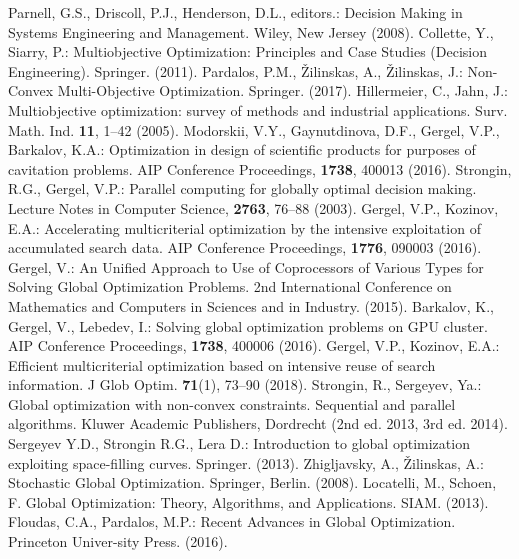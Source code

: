 \documentclass[runningheads]{llncs}
\begin{document}
%
%
%
% 
% 
%
\begin{thebibliography}{8}

	Parnell, G.S., Driscoll, P.J., Henderson, D.L., editors.: Decision Making in Systems Engineering and Management. Wiley, New Jersey (2008).
	Collette, Y., Siarry, P.: Multiobjective Optimization: Principles and Case Studies (Decision Engineering). Springer. (2011).
	Pardalos, P.M., {\v Z}ilinskas, A., {\v Z}ilinskas, J.: Non-Convex Multi-Objective Optimization. Springer. (2017).
	Hillermeier, C., Jahn, J.: Multiobjective optimization: survey of methods and industrial applications. Surv. Math. Ind. \textbf{11}, 1--42 (2005).
	Modorskii, V.Y., Gaynutdinova, D.F., Gergel, V.P., Barkalov, K.A.: Optimization in design of scientific products for purposes of cavitation problems. AIP Conference Proceedings, \textbf{1738}, 400013 (2016). 
	Strongin, R.G., Gergel, V.P.: Parallel computing for globally optimal decision making. Lecture Notes in Computer Science, \textbf{2763}, 76--88 (2003).
	Gergel, V.P., Kozinov, E.A.: Accelerating multicriterial optimization by the intensive exploitation of accumulated search data. AIP Conference Proceedings, \textbf{1776}, 090003 (2016). 
	Gergel, V.: An Unified Approach to Use of Coprocessors of Various Types for Solving Global Optimization Problems. 2nd International Conference on Mathematics and Computers in Sciences and in Industry. (2015). 
	Barkalov, K., Gergel, V., Lebedev, I.: Solving global optimization problems on GPU cluster. AIP Conference Proceedings, \textbf{1738}, 400006 (2016). 
	Gergel, V.P., Kozinov, E.A.: Efficient multicriterial optimization based on intensive reuse of search information. J Glob Optim. \textbf{71}(1), 73--90 (2018). 
	Strongin, R., Sergeyev, Ya.: Global optimization with non-convex constraints. Sequential and parallel algorithms. Kluwer Academic Publishers, Dordrecht (2nd ed. 2013, 3rd ed. 2014).
	Sergeyev Y.D., Strongin R.G., Lera D.: Introduction to global optimization exploiting space-filling curves. Springer. (2013).
	Zhigljavsky, A., {\v Z}ilinskas, A.: Stochastic Global Optimization. Springer, Berlin. (2008).
	Locatelli, M., Schoen, F. Global Optimization: Theory, Algorithms, and Applications. SIAM. (2013).
	Floudas, C.A., Pardalos, M.P.: Recent Advances in Global Optimization. Princeton Univer-sity Press. (2016).



\end{thebibliography}
\end{document}
